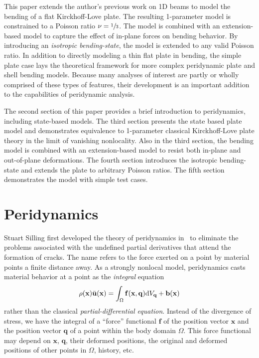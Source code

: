 \documentclass[preprint,review,12pt]{elsarticle}
\newcommand{\mathbi}[1]{\mathit{\mathbf{#1}}}
\begin{document}
This paper extends the author's previous work on 1D beams to model the bending of a flat Kirckhoff-Love plate.  The resulting 1-parameter model is constrained to a Poisson ratio \(\nu=\sfrac{1}{3}\).  The model is combined with an extension-based model to capture the effect of in-plane forces on bending behavior.  By introducing an \emph{isotropic bending-state}, the model is extended to any valid Poisson ratio.  In addition to directly modeling a thin flat plate in bending, the simple plate case lays the theoretical framework for more complex peridynamic plate and shell bending models.  Because many analyses of interest are partly or wholly comprised of these types of features, their development is an important addition to the capabilities of peridynamic analysis.

The second section of this paper provides a brief introduction to peridynamics, including state-based models.  The third section presents the state based plate model and demonstrates equivalence to 1-parameter classical Kirckhoff-Love plate theory in the limit of vanishing nonlocality.  Also in the third section, the bending model is combined with an extension-based model to resist both in-plane and out-of-plane deformations.  The fourth section introduces the isotropic bending-state and extends the plate to arbitrary Poisson ratios.  The fifth section demonstrates the model with simple test cases.

%
\section{Peridynamics}
\label{sec:PDintro}
Stuart Silling first developed the theory of peridynamics in~\cite{silling2000reformulation} to eliminate the problems associated with the undefined partial derivatives that attend the formation of cracks. The name refers to the force exerted on a point by material points a finite distance away. As a strongly nonlocal model, peridynamics casts material behavior at a point as the \textit{integral} equation 
%
\begin{equation}
    \label{eq:PDCoPV}
    \rho(\mathbf{x})\ddot{\mathbf{u}}(\mathbf{x}) = \int_\Omega \mathbi{f}(\mathbf{x},\mathbf{q}) {\rm d}V_\mathbf{q}  + \mathbf{b}(\mathbf{x}) \notag
\end{equation}
%
rather than the classical \textit{partial-differential equation}.  Instead of the divergence of stress, we have the integral of a ``force'' functional $\mathbi{f}$ of the position vector $\mathbf{x}$ and the position vector $\mathbf{q}$ of a point within the body domain $\Omega$.  This force functional may depend on \(\mathbf{x}\), \(\mathbf{q}\), their deformed positions, the original and deformed positions of other points in \(\Omega\), history, etc.
\end{document}
